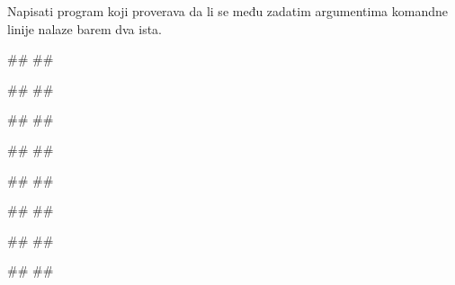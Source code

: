 \begin{Exercise}[label=p2.6_05] 
 Napisati program koji proverava da li se među zadatim argumentima 
 komandne linije nalaze barem dva ista.
 
\begin{miditest}
\begin{upotreba}{1}
#\naslovPokretanje#
##

#\naslovIzlaz#
##
\end{upotreba}
\end{miditest}
\begin{miditest}
\begin{upotreba}{2}
#\naslovPokretanje#
##

#\naslovIzlaz#
##
\end{upotreba}
\end{miditest}

\begin{miditest}
\begin{upotreba}{3}
#\naslovPokretanje#
##

#\naslovIzlaz#
##
\end{upotreba}
\end{miditest}
\begin{miditest}
\begin{upotreba}{4}
#\naslovPokretanje#
##

#\naslovIzlaz#
##
\end{upotreba}
\end{miditest}

\end{Exercise}
\ifresenja
\begin{Answer}[ref=p2.6_05]
\end{Answer}
 \fi


